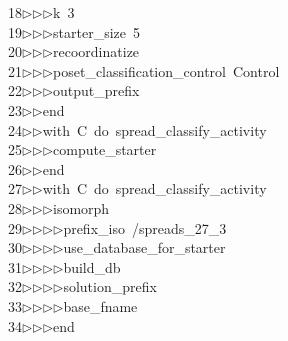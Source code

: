 \begin{tabbing}
18\>$\triangleright$\>$\triangleright$\>$\triangleright$\>k\ 3\ \\[0pt]
19\>$\triangleright$\>$\triangleright$\>$\triangleright$\>starter\_size\ 5\ \\[0pt]
20\>$\triangleright$\>$\triangleright$\>$\triangleright$\>recoordinatize\ \\[0pt]
21\>$\triangleright$\>$\triangleright$\>$\triangleright$\>poset\_classification\_control\ Control\ \\[0pt]
22\>$\triangleright$\>$\triangleright$\>$\triangleright$\>output\_prefix\ \ \\[0pt]
23\>$\triangleright$\>$\triangleright$\>end\ \\[0pt]
24\>$\triangleright$\>$\triangleright$\>with\ C\ do\ spread\_classify\_activity\ \\[0pt]
25\>$\triangleright$\>$\triangleright$\>$\triangleright$\>compute\_starter\ \\[0pt]
26\>$\triangleright$\>$\triangleright$\>end\ \\[0pt]
27\>$\triangleright$\>$\triangleright$\>with\ C\ do\ spread\_classify\_activity\ \\[0pt]
28\>$\triangleright$\>$\triangleright$\>$\triangleright$\>isomorph\ \\[0pt]
29\>$\triangleright$\>$\triangleright$\>$\triangleright$\>$\triangleright$\>prefix\_iso\ /spreads\_27\_3\ \\[0pt]
30\>$\triangleright$\>$\triangleright$\>$\triangleright$\>$\triangleright$\>use\_database\_for\_starter\ \\[0pt]
31\>$\triangleright$\>$\triangleright$\>$\triangleright$\>$\triangleright$\>build\_db\ \\[0pt]
32\>$\triangleright$\>$\triangleright$\>$\triangleright$\>$\triangleright$\>solution\_prefix\ \ \\[0pt]
33\>$\triangleright$\>$\triangleright$\>$\triangleright$\>$\triangleright$\>base\_fname\ \ \\[0pt]
34\>$\triangleright$\>$\triangleright$\>$\triangleright$\>end\ \\[0pt]

\end{tabbing}
